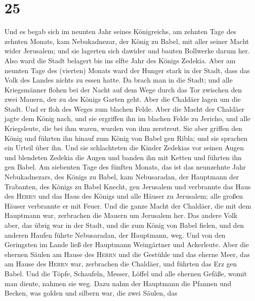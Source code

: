 \hypertarget{section-24}{%
\section{25}\label{section-24}}

 Und es begab sich im neunten Jahr seines Königreichs, am
zehnten Tage des zehnten Monats, kam Nebukadnezar, der König zu Babel,
mit aller seiner Macht wider Jerusalem; und sie lagerten sich dawider
und bauten Bollwerke darum her.  Also ward die Stadt
belagert bis ins elfte Jahr des Königs Zedekia.  Aber am
neunten Tage des (vierten) Monats ward der Hunger stark in der Stadt,
dass das Volk des Landes nichts zu essen hatte.  Da brach
man in die Stadt; und alle Kriegsmänner flohen bei der Nacht auf dem
Wege durch das Tor zwischen den zwei Mauern, der zu des Königs Garten
geht. Aber die Chaldäer lagen um die Stadt. Und er floh des Weges zum
blachen Felde.  Aber die Macht der Chaldäer jagte dem
König nach, und sie ergriffen ihn im blachen Felde zu Jericho, und alle
Kriegsleute, die bei ihm waren, wurden von ihm zerstreut. 
Sie aber griffen den König und führten ihn hinauf zum König von Babel
gen Ribla; und sie sprachen ein Urteil über ihn.  Und sie
schlachteten die Kinder Zedekias vor seinen Augen und blendeten Zedekia
die Augen und banden ihn mit Ketten und führten ihn gen Babel.
 Am siebenten Tage des fünften Monats, das ist das
neunzehnte Jahr Nebukadnezars, des Königs zu Babel, kam Nebusaradan, der
Hauptmann der Trabanten, des Königs zu Babel Knecht, gen Jerusalem
 und verbrannte das Haus des \textsc{Herrn} und das Haus
des Königs und alle Häuser zu Jerusalem; alle großen Häuser verbrannte
er mit Feuer.  Und die ganze Macht der Chaldäer, die mit
dem Hauptmann war, zerbrachen die Mauern um Jerusalem her.
 Das andere Volk aber, das übrig war in der Stadt, und
die zum König von Babel fielen, und den anderen Haufen führte
Nebusaradan, der Hauptmann, weg.  Und von den Geringsten
im Lande ließ der Hauptmann Weingärtner und Ackerleute. 
Aber die ehernen Säulen am Hause des \textsc{Herrn} und die Gestühle und
das eherne Meer, das am Hause des \textsc{Herrn} war, zerbrachen die
Chaldäer, und führten das Erz gen Babel.  Und die Töpfe,
Schaufeln, Messer, Löffel und alle ehernen Gefäße, womit man diente,
nahmen sie weg.  Dazu nahm der Hauptmann die Pfannen und
Becken, was golden und silbern war,  die zwei Säulen, das
